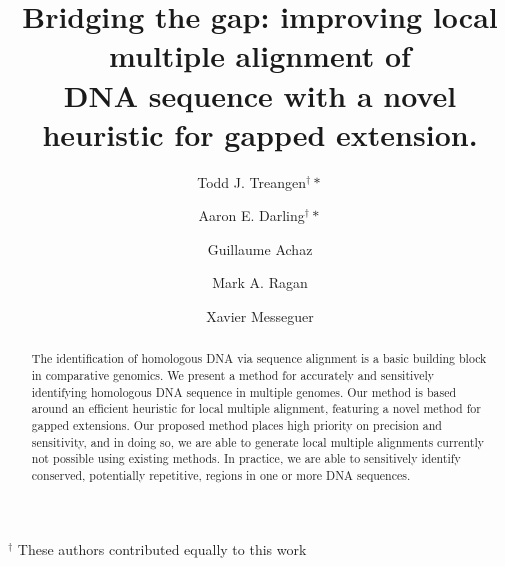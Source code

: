 \documentclass{ws-procs9x6}
\begin{document}
\title{Bridging the gap: improving local multiple alignment of \\DNA sequence with a novel heuristic for gapped extension.}

\author{Todd J. Treangen$^\dag*$}

\address{Dept. of Computer Science, Technical Univ. of Catalonia\\
Barcelona, Spain\\
$^*$E-mail: treangen@lsi.upc.edu}

\author{Aaron E. Darling$^\dag*$}

\address{Institute for Molecular Bioscience, Univ. of Queensland\\
Brisbane, Australia\\
$^*$E-mail: a.darling@imb.uq.edu.au}


\author{Guillaume Achaz}
\address{Atelier de Bioinformatique, Univ. Pierre et Marie Curie-Paris 6,\\
 Paris, France}

\author{ Mark A. Ragan}

\address{Institute for Molecular Bioscience, Univ. of Queensland\\
Brisbane, Australia\\
}

\author{ Xavier Messeguer}

\address{Dept. of Computer Science, Technical Univ. of Catalonia\\
Barcelona, Spain\\
}

{\center \scriptsize $^\dag$ These authors contributed equally to this work \\}

\begin{abstract}
The identification of homologous DNA via sequence alignment is a basic building block in comparative genomics.  We present a method for accurately and sensitively identifying homologous DNA sequence in multiple genomes. Our method is based around an efficient heuristic for local multiple alignment, featuring a novel method for gapped extensions. Our proposed method places high priority on precision and sensitivity, and in doing so, we are able to generate local multiple alignments currently not possible using existing methods. In practice, we are able to sensitively identify conserved, potentially repetitive, regions in one or more DNA sequences.
\end{abstract}

\end{document}
